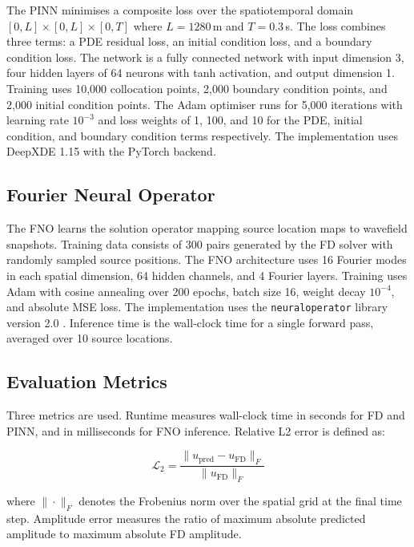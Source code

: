 \documentclass[12pt,a4paper]{article}
\begin{document}
The PINN minimises a composite loss over the spatiotemporal
domain $[0,L] \times [0,L] \times [0,T]$ where $L = 1280$\,m
and $T = 0.3$\,s. The loss combines three terms: a PDE residual
loss, an initial condition loss, and a boundary condition loss.
The network is a fully connected network with input dimension 3,
four hidden layers of 64 neurons with tanh activation, and output
dimension 1. Training uses 10,000 collocation points, 2,000
boundary condition points, and 2,000 initial condition points.
The Adam optimiser runs for 5,000 iterations with learning rate
$10^{-3}$ and loss weights of 1, 100, and 10 for the PDE,
initial condition, and boundary condition terms respectively.
The implementation uses DeepXDE 1.15 with the PyTorch backend.

\subsection{Fourier Neural Operator}

The FNO learns the solution operator mapping source location
maps to wavefield snapshots. Training data consists of 300 pairs
generated by the FD solver with randomly sampled source
positions. The FNO architecture uses 16 Fourier modes in each
spatial dimension, 64 hidden channels, and 4 Fourier layers.
Training uses Adam with cosine annealing over 200 epochs, batch
size 16, weight decay $10^{-4}$, and absolute MSE loss. The
implementation uses the \texttt{neuraloperator} library version
2.0 \citep{li2021}. Inference time is the wall-clock time for a
single forward pass, averaged over 10 source locations.

\subsection{Evaluation Metrics}

Three metrics are used. Runtime measures wall-clock time in
seconds for FD and PINN, and in milliseconds for FNO inference.
Relative L2 error is defined as:

\begin{equation}
\mathcal{L}_2 = \frac{\|u_{\text{pred}} -
u_{\text{FD}}\|_F}{\|u_{\text{FD}}\|_F}
\label{eq:l2}
\end{equation}

where $\|\cdot\|_F$ denotes the Frobenius norm over the spatial
grid at the final time step. Amplitude error measures the ratio
of maximum absolute predicted amplitude to maximum absolute FD
amplitude.
\end{document}
